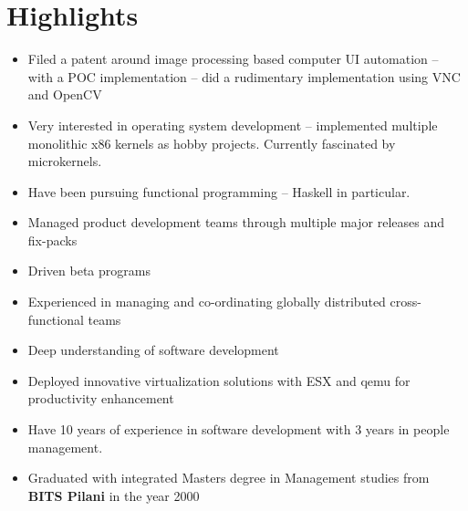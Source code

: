 \documentclass [a4paper,11pt] {article}
\begin{document}
\section*{Highlights}
\begin{itemize}
\item Filed a patent around image processing based computer UI automation –
with a POC implementation – did a rudimentary implementation using VNC and
OpenCV

\item Very interested in operating system development – implemented multiple
monolithic x86 kernels as hobby projects. Currently fascinated by microkernels.

\item Have been pursuing functional programming – Haskell in particular.

\item Managed product development teams through multiple major releases and
fix-packs  

\item Driven beta programs

\item Experienced in managing and co-ordinating globally distributed
cross-functional teams

\item Deep understanding of software development

\item Deployed innovative virtualization solutions with ESX and qemu for
productivity enhancement

\item Have 10 years of experience in software development with 3 years in
people management.

\item Graduated with integrated Masters degree in Management studies from {\bf BITS
Pilani} in the year 2000
\end{itemize}
\end{document}
